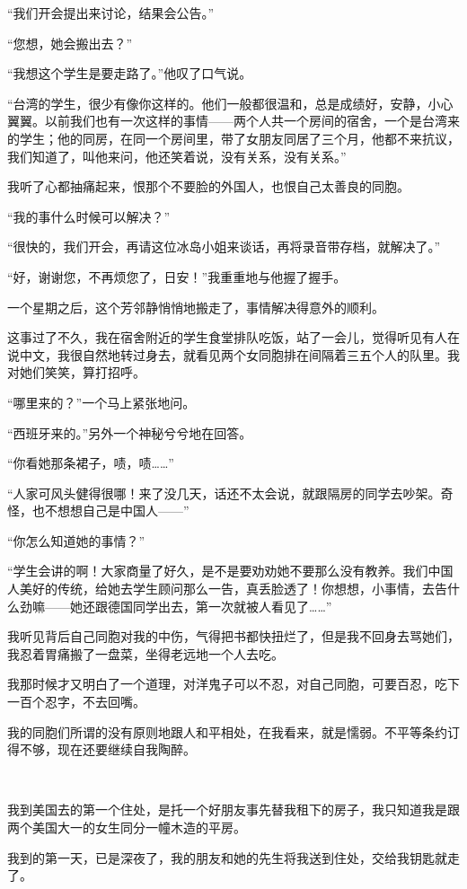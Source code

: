 \par “我们开会提出来讨论，结果会公告。”
\par “您想，她会搬出去？”
\par “我想这个学生是要走路了。”他叹了口气说。
\par “台湾的学生，很少有像你这样的。他们一般都很温和，总是成绩好，安静，小心翼翼。以前我们也有一次这样的事情——两个人共一个房间的宿舍，一个是台湾来的学生；他的同房，在同一个房间里，带了女朋友同居了三个月，他都不来抗议，我们知道了，叫他来问，他还笑着说，没有关系，没有关系。”
\par 我听了心都抽痛起来，恨那个不要脸的外国人，也恨自己太善良的同胞。
\par “我的事什么时候可以解决？”
\par “很快的，我们开会，再请这位冰岛小姐来谈话，再将录音带存档，就解决了。”
\par “好，谢谢您，不再烦您了，日安！”我重重地与他握了握手。
\par 一个星期之后，这个芳邻静悄悄地搬走了，事情解决得意外的顺利。
\par 这事过了不久，我在宿舍附近的学生食堂排队吃饭，站了一会儿，觉得听见有人在说中文，我很自然地转过身去，就看见两个女同胞排在间隔着三五个人的队里。我对她们笑笑，算打招呼。
\par “哪里来的？”一个马上紧张地问。
\par “西班牙来的。”另外一个神秘兮兮地在回答。
\par “你看她那条裙子，啧，啧……”
\par “人家可风头健得很哪！来了没几天，话还不太会说，就跟隔房的同学去吵架。奇怪，也不想想自己是中国人——”
\par “你怎么知道她的事情？”
\par “学生会讲的啊！大家商量了好久，是不是要劝劝她不要那么没有教养。我们中国人美好的传统，给她去学生顾问那么一告，真丢脸透了！你想想，小事情，去告什么劲嘛——她还跟德国同学出去，第一次就被人看见了……”
\par 我听见背后自己同胞对我的中伤，气得把书都快扭烂了，但是我不回身去骂她们，我忍着胃痛搬了一盘菜，坐得老远地一个人去吃。
\par 我那时候才又明白了一个道理，对洋鬼子可以不忍，对自己同胞，可要百忍，吃下一百个忍字，不去回嘴。
\par 我的同胞们所谓的没有原则地跟人和平相处，在我看来，就是懦弱。不平等条约订得不够，现在还要继续自我陶醉。
\par  
\par 我到美国去的第一个住处，是托一个好朋友事先替我租下的房子，我只知道我是跟两个美国大一的女生同分一幢木造的平房。
\par 我到的第一天，已是深夜了，我的朋友和她的先生将我送到住处，交给我钥匙就走了。

